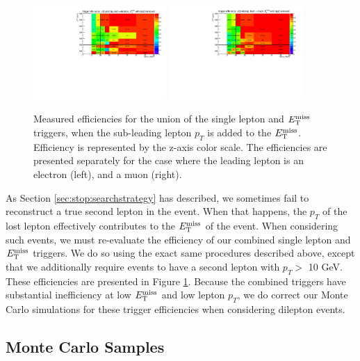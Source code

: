 \begin{figure}[htb]
\centering
\includegraphics[width=0.45\textwidth]{figures/TriggerEff2l_el.pdf}
\includegraphics[width=0.45\textwidth]{figures/TriggerEff2l_mu.pdf}
\caption{Measured efficiencies for the union of the single lepton and
  $E_\text{T}^\text{miss}$ triggers, when the sub-leading lepton $p_T$ is added to the
  $E_\text{T}^\text{miss}$. Efficiency is represented by the z-axis color scale. The
  efficiencies are presented separately for the case where
  the leading lepton is an electron (left), and a muon (right).}
\label{fig:stop:trigeff:2ndlepplusmet}
\end{figure}

As Section \ref{sec:stop:searchstrategy} has described, we sometimes
fail to reconstruct a true second lepton in the event. When that
happens, the $p_T$ of the lost lepton effectively
contributes to the $E_\text{T}^\text{miss}$ of the event. When considering such events, we must
re-evaluate the efficiency of our combined single lepton and $E_\text{T}^\text{miss}$
triggers. We do so using the exact same procedures described above,
except that we additionally require events to have a second lepton
with $p_T >$ 10 GeV. These efficiencies are presented in Figure
\ref{fig:stop:trigeff:2ndlepplusmet}. Because the combined triggers
have substantial inefficiency at low $E_\text{T}^\text{miss}$ and low lepton $p_T$, we
do correct our Monte Carlo simulations for these trigger
efficiencies when considering dilepton events.

\subsection{Monte Carlo Samples}
\label{ssec:stop:mcsamples}

